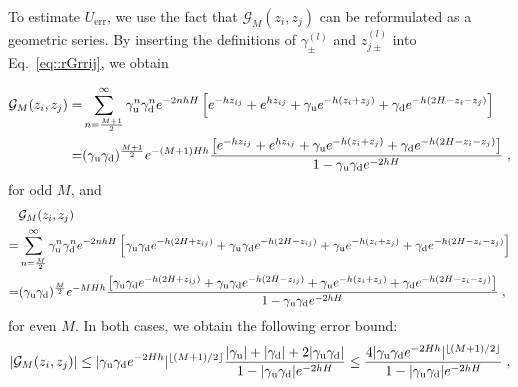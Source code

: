 To estimate $U_{\text{err}}$, we use the fact that $\mathcal{G}_{M}(z_i,z_j)$ can be reformulated as a geometric series. By inserting the definitions of $\gamma_{\pm}^{(l)}$ and $z_{j \pm}^{(l)}$ into Eq.~\eqref{eq::rGrrij}, we obtain 

\begin{equation}
    \begin{split}
        \mathcal{G}_{M}(z_i,z_j) = & \sum_{n = \frac{M + 1}{2}}^{\infty} \gamma_{\text{u}}^n \gamma_{\text{d}}^n e^{-2nhH} \left[ e^{- h z_{ij}} + e^{h z_{ij}} + \gamma_{\text{u}} e^{- h (z_i + z_j)} + \gamma_{\text{d}} e^{- h (2 H  - z_i - z_j)}\right] \\
        = & (\gamma_{\text{u}} \gamma_{\text{d}})^{\frac{M + 1}{2}} e^{- (M +1) H h} \frac{\left[e^{-h z_{ij}} + e^{h z_{ij}} + \gamma_{\text{u}} e^{- h (z_i + z_j)} + \gamma_{\text{d}} e^{- h (2 H - z_i - z_j)} \right] }{1 - \gamma_{\text{u}} \gamma_{\text{d}} e^{-2hH}} \;,
    \end{split}
\end{equation}
for odd $M$, and 
\begin{equation}
    \begin{split}
        & \mathcal{G}_M(z_i,z_j) \\
        = & \sum_{n = \frac{M}{2}}^{\infty}  \gamma_{\text{u}}^n \gamma_{\text{d}}^n e^{- 2nhH} \left[  \gamma_{\text{u}} \gamma_{\text{d}} e^{- h (2 H  + z_{ij})} + \gamma_{\text{u}} \gamma_{\text{d}}  e^{- h (2 H  - z_{ij})} + \gamma_{\text{u}} e^{- h (z_i + z_j)} + \gamma_{\text{d}} e^{- h (2H  - z_i - z_j)} \right] \\
        = & (\gamma_{\text{u}} \gamma_{\text{d}})^{\frac{M}{2}} e^{- M H h} \frac{\left[ \gamma_{\text{u}} \gamma_{\text{d}} e^{- h (2 H + z_{ij})} + \gamma_{\text{u}} \gamma_{\text{d}} e^{- h (2H - z_{ij})} + \gamma_{\text{u}} e^{ - h (z_i + z_j)} + \gamma_{\text{d}} e^{-h (2 H - z_i - z_j)} \right]}{1 - \gamma_{\text{u}} \gamma_{\text{d}} e^{-2hH}}  \;,
    \end{split}
\end{equation}
for even $M$. In both cases, we obtain the following error bound:
\begin{equation}\label{eq:beta_ij}
    \lvert \mathcal{G}_{M}(z_i,z_j) \rvert \leq \lvert\gamma_{\text{u}} \gamma_{\text{d}} e^{- 2 H h}\rvert^{\lfloor{(M+1)/2}\rfloor} \frac{\lvert\gamma_{\text{u}}\rvert + \lvert\gamma_{\text{d}}\rvert + 2 \lvert\gamma_{\text{u}} \gamma_{\text{d}}\rvert}{1 - \lvert\gamma_{\text{u}} \gamma_{\text{d}}\rvert e^{-2hH}} \leq \frac{4 \lvert\gamma_{\text{u}} \gamma_{\text{d}} e^{- 2 H h}\rvert^{\lfloor{(M+1)/2}\rfloor}}{1 - \lvert\gamma_{\text{u}} \gamma_{\text{d}}\rvert e^{-2hH}} \;,
\end{equation}
